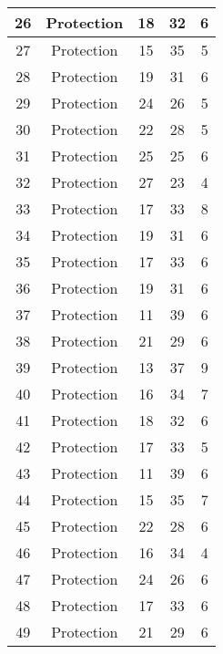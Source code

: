 \documentclass[results.tex]{subfiles}
\begin{document}
\begin{center}
\begin{tabular}{| c || c | c | c | c |}
    \hline
    26 & Protection & 18 & 32 & 6 \\ 
    \hline
    27 & Protection & 15 & 35 & 5 \\ 
    \hline
    28 & Protection & 19 & 31 & 6 \\ 
    \hline
    29 & Protection & 24 & 26 & 5 \\ 
    \hline
    30 & Protection & 22 & 28 & 5 \\ 
    \hline
    31 & Protection & 25 & 25 & 6 \\ 
    \hline
    32 & Protection & 27 & 23 & 4 \\ 
    \hline
    33 & Protection & 17 & 33 & 8 \\ 
    \hline
    34 & Protection & 19 & 31 & 6 \\ 
    \hline
    35 & Protection & 17 & 33 & 6 \\ 
    \hline
    36 & Protection & 19 & 31 & 6 \\ 
    \hline
    37 & Protection & 11 & 39 & 6 \\ 
    \hline
    38 & Protection & 21 & 29 & 6 \\ 
    \hline
    39 & Protection & 13 & 37 & 9 \\ 
    \hline
    40 & Protection & 16 & 34 & 7 \\ 
    \hline
    41 & Protection & 18 & 32 & 6 \\ 
    \hline
    42 & Protection & 17 & 33 & 5 \\ 
    \hline
    43 & Protection & 11 & 39 & 6 \\ 
    \hline
    44 & Protection & 15 & 35 & 7 \\ 
    \hline
    45 & Protection & 22 & 28 & 6 \\ 
    \hline
    46 & Protection & 16 & 34 & 4 \\ 
    \hline
    47 & Protection & 24 & 26 & 6 \\ 
    \hline
    48 & Protection & 17 & 33 & 6 \\ 
    \hline
    49 & Protection & 21 & 29 & 6 \\ 
    \hline   \end{tabular}
\end{center}
\end{document}
